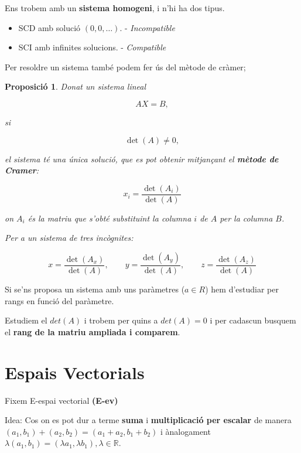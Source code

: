 \documentclass[12pt]{article}
\newtheorem{proposicio}{Proposició}[section]
\newcommand{\R}{\mathbb{R}}
\begin{document}
Ens trobem amb un \textbf{sistema homogeni}, i n'hi ha dos tipus.

\begin{itemize}
    \item SCD amb solució $(0,0,\dots)$. - \textit{Incompatible}
    \item SCI amb infinites solucions. - \textit{Compatible}
\end{itemize}

Per resoldre un sistema també podem fer ús del mètode de cràmer;

\begin{proposicio}

Donat un sistema lineal

$$
AX=B,
$$

si

$$
\det(A)\neq 0,
$$

el sistema té una única solució, que es pot obtenir mitjançant el \textbf{mètode de Cramer}:

$$
\boxed{x_i=\frac{\det(A_i)}{\det(A)}}
$$

on $A_i$ és la matriu que s'obté substituint la \textit{columna $i$ de $A$} per la columna $B$.

Per a un sistema de tres incògnites:

$$
\boxed{
x=\frac{\det(A_x)}{\det(A)},
\qquad
y=\frac{\det(A_y)}{\det(A)},
\qquad
z=\frac{\det(A_z)}{\det(A)}
}
$$

\end{proposicio}

Si se'ns proposa un sistema amb uns paràmetres ($a \in R$) hem d'estudiar per rangs en funció del paràmetre.

Estudiem el $det(A)$ i trobem per quins a $det(A) = 0$ i per cadascun busquem el \textbf{rang de la matriu ampliada i comparem}.

\section{Espais Vectorials}

Fixem E-espai vectorial \textbf{(E-ev)}

Idea: Cos on es pot dur a terme \textbf{suma} i \textbf{multiplicació per escalar} de manera $(a_1, b_1) + (a_2, b_2) = (a_1 + a_2, b_1 + b_2)$ i ànalogament $\lambda(a_1, b_1) = (\lambda a_1, \lambda b_1), \lambda\in\R$.
\end{document}
